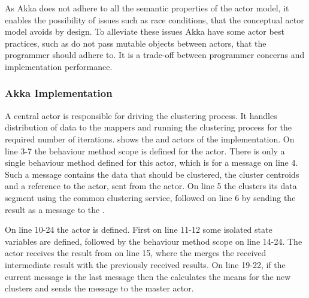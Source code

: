 As Akka does not adhere to all the semantic properties of the actor model, it enables the possibility of issues such as race conditions, that the conceptual actor model avoids by design. To alleviate these issues Akka have some actor best practices, such as do not pass mutable objects between actors, that the programmer should adhere to\cite[p. 12]{akkaDoc}. It is a trade-off between programmer concerns and implementation performance.


\subsubsection{Akka Implementation}
A central  actor is responsible for driving the clustering process. It handles distribution of data to the mappers and running the clustering process for the required number of iterations.  shows the  and  actors of the implementation. On line 3-7 the behaviour method scope is defined for the  actor. There is only a single behaviour method defined for this actor, which is for a  message on line 4. Such a message contains the data that should be clustered, the cluster centroids and a reference to the  actor, sent from the  actor. On line 5 the  clusters its data segment using the common clustering service, followed on line 6 by sending the result as a  message to the .

On line 10-24 the  actor is defined. First on line 11-12 some isolated state variables are defined, followed by the behaviour method scope on line 14-24.
The  actor receives the result from  on line 15, where the  merges the received intermediate result with the previously received results. On line 19-22, if the current message is the last message then the  calculates the means for the new clusters and sends the  message to the master actor.


